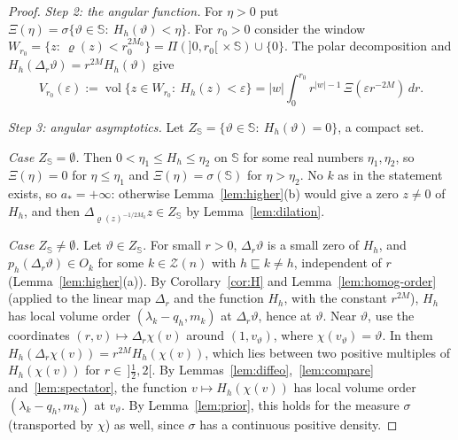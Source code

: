 \documentclass[11pt,a4paper]{article}
\theoremstyle{definition}
\theoremstyle{remark}
\numberwithin{equation}{section}
\newcommand{\vol}{\operatorname{vol}}
\newcommand{\abs}[1]{\lvert #1\rvert}
\newcommand{\eps}{\varepsilon}
\newcommand{\Zb}{\mathcal Z}
\begin{document}
\begin{proof}
\emph{Step 2: the angular function.} For $\eta>0$ put $\Xi(\eta)=\sigma\{\vartheta\in\mathbb S:\ H_h(\vartheta)<\eta\}$. For $r_0>0$ consider the window $W_{r_0}=\{z:\ \varrho(z)<r_0^{2M_0}\}=\Pi(]0,r_0[\,\times\mathbb S)\cup\{0\}$. The polar decomposition and $H_h(\Delta_r\vartheta)=r^{2M}H_h(\vartheta)$ give
\begin{equation}\label{eq:polar}
V_{r_0}(\eps):=\vol\{z\in W_{r_0}:\ H_h(z)<\eps\}=\abs w\int_0^{r_0}r^{\abs w-1}\,\Xi(\eps r^{-2M})\,dr .
\end{equation}

\emph{Step 3: angular asymptotics.} Let $Z_{\mathbb S}=\{\vartheta\in\mathbb S:\ H_h(\vartheta)=0\}$, a compact set.

\emph{Case $Z_{\mathbb S}=\emptyset$.} Then $0<\eta_1\le H_h\le\eta_2$ on $\mathbb S$ for some real numbers $\eta_1,\eta_2$, so $\Xi(\eta)=0$ for $\eta\le\eta_1$ and $\Xi(\eta)=\sigma(\mathbb S)$ for $\eta>\eta_2$. No $k$ as in the statement exists, so $a_*=+\infty$: otherwise Lemma~\ref{lem:higher}(b) would give a zero $z\neq0$ of $H_h$, and then $\Delta_{\varrho(z)^{-1/2M_0}}z\in Z_{\mathbb S}$ by Lemma~\ref{lem:dilation}.

\emph{Case $Z_{\mathbb S}\neq\emptyset$.} Let $\vartheta\in Z_{\mathbb S}$. For small $r>0$, $\Delta_r\vartheta$ is a small zero of $H_h$, and $p_h(\Delta_r\vartheta)\in O_k$ for some $k\in\Zb(n)$ with $h\sqsubseteq k\neq h$, independent of $r$ (Lemma~\ref{lem:higher}(a)). By Corollary~\ref{cor:H} and Lemma~\ref{lem:homog-order} (applied to the linear map $\Delta_r$ and the function $H_h$, with the constant $r^{2M}$), $H_h$ has local volume order $(\lambda_k-q_h,m_k)$ at $\Delta_r\vartheta$, hence at $\vartheta$. Near $\vartheta$, use the coordinates $(r,v)\mapsto\Delta_r\chi(v)$ around $(1,v_\vartheta)$, where $\chi(v_\vartheta)=\vartheta$. In them $H_h(\Delta_r\chi(v))=r^{2M}H_h(\chi(v))$, which lies between two positive multiples of $H_h(\chi(v))$ for $r\in\,]\frac12,2[$. By Lemmas~\ref{lem:diffeo},~\ref{lem:compare} and~\ref{lem:spectator}, the function $v\mapsto H_h(\chi(v))$ has local volume order $(\lambda_k-q_h,m_k)$ at $v_\vartheta$. By Lemma~\ref{lem:prior}, this holds for the measure $\sigma$ (transported by $\chi$) as well, since $\sigma$ has a continuous positive density.


\end{proof}
\end{document}
